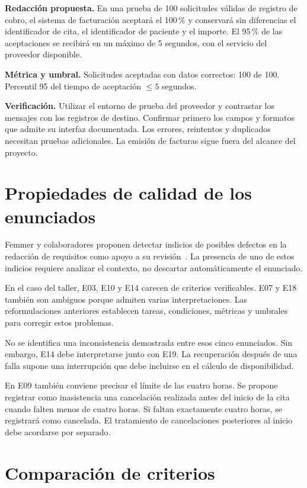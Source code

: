 \documentclass[11pt,a4paper]{article}
\begin{document}
\textbf{Redacción propuesta.}
En una prueba de 100 solicitudes válidas de registro de cobro,
el sistema de facturación aceptará el 100\,\% y conservará sin
diferencias el identificador de cita, el identificador de paciente
y el importe. El 95\,\% de las aceptaciones se recibirá en un máximo
de 5 segundos, con el servicio del proveedor disponible.

\textbf{Métrica y umbral.}
Solicitudes aceptadas con datos correctos: 100 de 100.
Percentil 95 del tiempo de aceptación $\leq 5$ segundos.

\textbf{Verificación.}
Utilizar el entorno de prueba del proveedor y contrastar los mensajes
con los registros de destino. Confirmar primero los campos y formatos
que admite su interfaz documentada. Los errores, reintentos y
duplicados necesitan pruebas adicionales. La emisión de facturas
sigue fuera del alcance del proyecto.

\section{Propiedades de calidad de los enunciados}

Femmer y colaboradores proponen detectar indicios de posibles
defectos en la redacción de requisitos como apoyo a su
revisión~\cite{femmer2017}. La presencia de uno de estos indicios
requiere analizar el contexto, no descartar automáticamente
el enunciado.

En el caso del taller, E03, E10 y E14 carecen de criterios
verificables. E07 y E18 también son ambiguos porque admiten varias
interpretaciones. Las reformulaciones anteriores establecen tareas,
condiciones, métricas y umbrales para corregir estos problemas.

No se identifica una inconsistencia demostrada entre esos cinco
enunciados. Sin embargo, E14 debe interpretarse junto con E19.
La recuperación después de una falla supone una interrupción que
debe incluirse en el cálculo de disponibilidad.

En E09 también conviene precisar el límite de las cuatro horas.
Se propone registrar como inasistencia una cancelación realizada
antes del inicio de la cita cuando falten menos de cuatro horas.
Si faltan exactamente cuatro horas, se registrará como cancelada.
El tratamiento de cancelaciones posteriores al inicio debe
acordarse por separado.

\section{Comparación de criterios}
\end{document}
